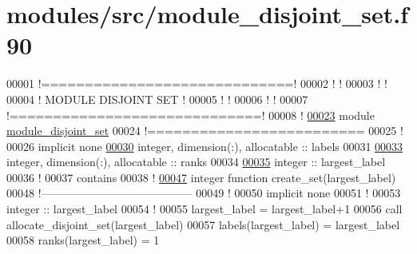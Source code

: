 \hypertarget{module__disjoint__set_8f90_source}{
\section{modules/src/module\-\_\-disjoint\-\_\-set.f90}
}

\begin{DoxyCode}
00001 \textcolor{comment}{!=============================!}
00002 \textcolor{comment}{!                             !}
00003 \textcolor{comment}{!                             !}
00004 \textcolor{comment}{!     MODULE DISJOINT SET     !  }
00005 \textcolor{comment}{!                             !}
00006 \textcolor{comment}{!                             !}
00007 \textcolor{comment}{!=============================!}
00008 \textcolor{comment}{!}
\hypertarget{module__disjoint__set_8f90_source_l00023}{}\hyperlink{classmodule__disjoint__set}{00023} \textcolor{keyword}{module} \hyperlink{classmodule__disjoint__set}{module_disjoint_set}
00024 \textcolor{comment}{!=========================}
00025   \textcolor{comment}{!}
00026   \textcolor{keyword}{implicit none}
\hypertarget{module__disjoint__set_8f90_source_l00030}{}\hyperlink{classmodule__disjoint__set_afd35cdfbb8e055e9e184b5359627bf5e}{00030}   \textcolor{keywordtype}{integer}, \textcolor{keywordtype}{dimension(:)}, \textcolor{keywordtype}{allocatable} :: labels
00031 
\hypertarget{module__disjoint__set_8f90_source_l00033}{}\hyperlink{classmodule__disjoint__set_af861c992aa8ba85ccc2943ec786d9ceb}{00033}   \textcolor{keywordtype}{integer}, \textcolor{keywordtype}{dimension(:)}, \textcolor{keywordtype}{allocatable} :: ranks
00034 
\hypertarget{module__disjoint__set_8f90_source_l00035}{}\hyperlink{classmodule__disjoint__set_a2ef0620ab0fd7047b16e522c4db4c590}{00035}   \textcolor{keywordtype}{integer} :: largest\_label
00036   \textcolor{comment}{!}
00037 \textcolor{keyword}{contains}
00038   \textcolor{comment}{!}
\hypertarget{module__disjoint__set_8f90_source_l00047}{}\hyperlink{classmodule__disjoint__set_a769c6fb3576cdcd2f96f2cabcf76cf10}{00047}   \textcolor{keyword}{integer }\textcolor{keyword}{function }create\_set(largest\_label)
00048   \textcolor{comment}{!-----------------------------------------}
00049     \textcolor{comment}{!}
00050     \textcolor{keyword}{implicit none}
00051     \textcolor{comment}{!}
00053     \textcolor{keywordtype}{integer} :: largest\_label
00054     \textcolor{comment}{!}
00055     largest\_label = largest\_label+1
00056     call allocate\_disjoint\_set(largest\_label)
00057     labels(largest\_label) = largest\_label
00058     ranks(largest\_label) = 1

\end{DoxyCode}
